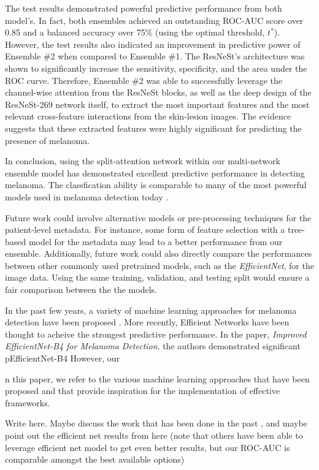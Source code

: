 \documentclass [MAS] {uclathes}
\begin{document}
The test results demonstrated powerful predictive performance from both model's. In fact, both ensembles achieved an outstanding ROC-AUC score over 0.85 and a balanced accuracy over 75\% (using the optimal threshold, $t^*$). However, the test results also indicated an improvement in predictive power of Ensemble \#2 when compared to Ensemble \#1. The ResNeSt's architecture was shown to significantly increase the sensitivity, specificity, and the area under the ROC curve. Therefore, Ensemble \#2 was able to successfully leverage the channel-wise attention from the ResNeSt blocks, as well as the deep design of the ResNeSt-269 network itself, to extract the most important features and the most relevant cross-feature interactions from the skin-lesion images. The evidence suggests that these extracted features were highly significant for predicting the presence of melanoma.

In conclusion, using the split-attention network within our multi-network ensemble model has demonstrated excellent predictive performance in detecting melanoma. The classfication ability is comparable to many of the most powerful models used in melanoma detection today \cite{EffNet_MelDet}. 

Future work could involve alternative models or pre-processing techniques for the patient-level metadata. For instance, some form of feature selection with a tree-based model for the metadata may lead to a better performance from our ensemble. Additionally, future work could also directly compare the performances between other commonly used pretrained models, such as the \textit{EfficientNet}, for the image data. Using the same training, validation, and testing split would ensure a fair comparison between the the models.

In the past few years, a variety of machine learning approaches for melanoma detection have been proposed \cite{VariousMethods}. More recently, Efficient Networks have been thought to acheive the strongest predictive performance. In the paper, \textit{Improved EfficientNet-B4 for Melanoma Detection}, the authors demonstrated significant pEfficientNet-B4 \cite{EffNet_MelDet} However, our


n this paper, we refer to the various machine learning approaches that have been proposed and that provide inspiration for the implementation of effective frameworks.



Write here. Maybe discuss the work that has been done in the past \cite{VariousMethods}, and maybe point out the efficient net results from here \cite{EffNet_MelDet} (note that others have been able to leverage efficient net model to get even better results, but our ROC-AUC is comparable amongst the best available options)



\end{document}
